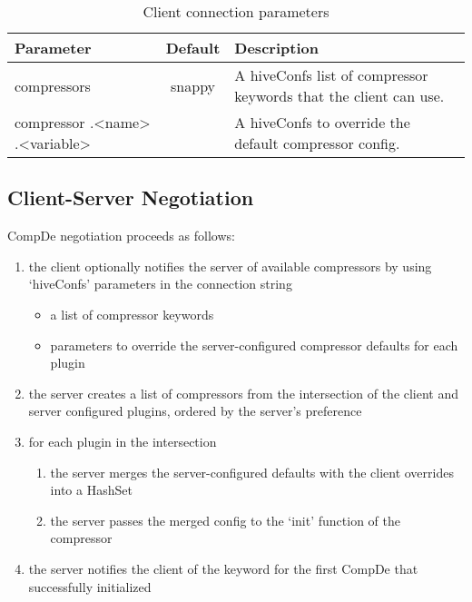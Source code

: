 \documentclass[11pt,a4paper]{article}
\begin{document}
		\begin{table}[H]
			\begin{tabular}{| p{3cm} | c | p{6.5cm} |} \hline
				
				\textbf{Parameter} & \textbf{Default} & \textbf{Description} \\ \hline
				compressors
				& snappy
				& A hiveConfs list of compressor keywords that the client can use. 
				\\ \hline
				
				compressor\linebreak
				.\textless name\textgreater\linebreak
				.\textless variable\textgreater
				&
				& A hiveConfs to override the default compressor config. 
				\\ \hline
				
			\end{tabular}
			\caption{Client connection parameters}
		\end{table}
		
		\subsection{Client-Server Negotiation}
		
		CompDe negotiation proceeds as follows:
		
		\begin{enumerate}
			
			\item the client optionally notifies the server of available compressors by using `hiveConfs' parameters in the connection string
			\begin{itemize}
				\item a list of compressor keywords
				\item parameters to override the server-configured compressor defaults for each plugin
			\end{itemize}
			
			\item the server creates a list of compressors from the intersection of the client and server configured plugins, ordered by the server's preference
			
			\item for each plugin in the intersection
			\begin{enumerate}[1.]
				\item the server merges the server-configured defaults with the client overrides into a HashSet
				\item the server passes the merged config to the `init' function of the compressor
			\end{enumerate}
			
			\item the server notifies the client of the keyword for the first CompDe that successfully initialized
		\end{enumerate}
		
\end{document}
